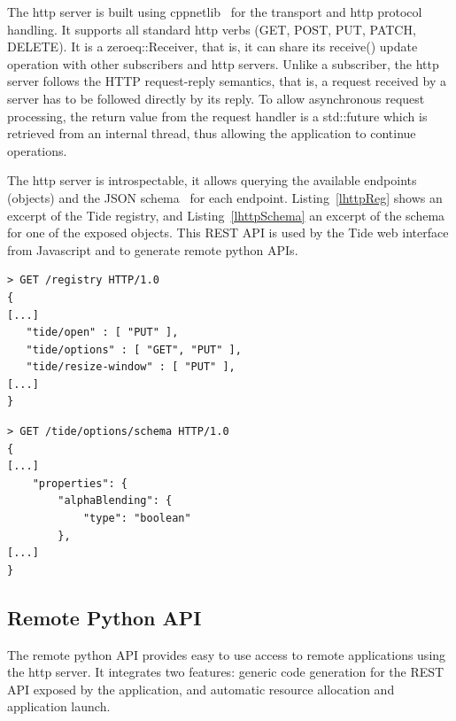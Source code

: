 \documentclass[10pt]{llncs}
\newcommand{\lref}[1]{Listing~\ref{#1}}
\begin{document}
The http server is built using cppnetlib~\cite{cppnetlib} for the transport and
http protocol handling. It supports all standard http verbs (GET, POST, PUT,
PATCH, DELETE). It is a \textsf{zeroeq::Receiver}, that is, it can share its
\textsf{receive()} update operation with other subscribers and http servers.
Unlike a subscriber, the http server follows the HTTP request-reply semantics,
that is, a request received by a server has to be followed directly by its
reply. To allow asynchronous request processing, the return value from the
request handler is a \textsf{std::future} which is retrieved from an internal
thread, thus allowing the application to continue operations.

The http server is introspectable, it allows querying the available endpoints
(objects) and the JSON schema~\cite{jsonschema} for each endpoint.
\lref{lhttpReg} shows an excerpt of the Tide registry, and \lref{lhttpSchema} an
excerpt of the schema for one of the exposed objects. This REST API is used by
the Tide web interface from Javascript and to generate remote python APIs.

\noindent\begin{minipage}[b][][b]{.48\textwidth}
\begin{lstlisting}[caption=HTTP Server Registry, label=lhttpReg]
> GET /registry HTTP/1.0
{
[...]
   "tide/open" : [ "PUT" ],
   "tide/options" : [ "GET", "PUT" ],
   "tide/resize-window" : [ "PUT" ],
[...]
}
\end{lstlisting}
\end{minipage}\hfill
\begin{minipage}[b][][b]{.48\textwidth}
\begin{lstlisting}[caption=Object JSON Schema, label=lhttpSchema]
> GET /tide/options/schema HTTP/1.0
{
[...]
    "properties": {
        "alphaBlending": {
            "type": "boolean"
        },
[...]
}
\end{lstlisting}
\end{minipage}

\subsection{Remote Python API}

The remote python API provides easy to use access to remote applications using
the http server. It integrates two features: generic code generation for the
REST API exposed by the application, and automatic resource allocation and
application launch.
\end{document}
